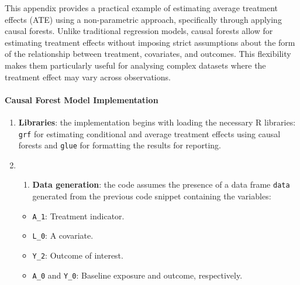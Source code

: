 \documentclass[
  singlecolumn]{article}
\let\oldparagraph\paragraph
\renewcommand{\paragraph}[1]{\oldparagraph{#1}\mbox{}}
\providecommand{\tightlist}{%
  \setlength{\itemsep}{0pt}\setlength{\parskip}{0pt}}\usepackage{longtable,booktabs,array}
\begin{document}
This appendix provides a practical example of estimating average
treatment effects (ATE) using a non-parametric approach, specifically
through applying causal forests. Unlike traditional regression models,
causal forests allow for estimating treatment effects without imposing
strict assumptions about the form of the relationship between treatment,
covariates, and outcomes. This flexibility makes them particularly
useful for analysing complex datasets where the treatment effect may
vary across observations.

\paragraph{Causal Forest Model
Implementation}\label{causal-forest-model-implementation}

\begin{enumerate}
\def\labelenumi{\arabic{enumi}.}
\item
  \textbf{Libraries}: the implementation begins with loading the
  necessary R libraries: \texttt{grf} for estimating conditional and
  average treatment effects using causal forests and \texttt{glue} for
  formatting the results for reporting.
\item
  \begin{enumerate}
  \def\labelenumii{\arabic{enumii}.}
  \tightlist
  \item
    \textbf{Data generation}: the code assumes the presence of a data
    frame \texttt{data} generated from the previous code snippet
    containing the variables:
  \end{enumerate}

  \begin{itemize}
  \tightlist
  \item
    \texttt{A\_1}: Treatment indicator.
  \item
    \texttt{L\_0}: A covariate.
  \item
    \texttt{Y\_2}: Outcome of interest.
  \item
    \texttt{A\_0} and \texttt{Y\_0}: Baseline exposure and outcome,
    respectively.
  \end{itemize}


\end{enumerate}
\end{document}
